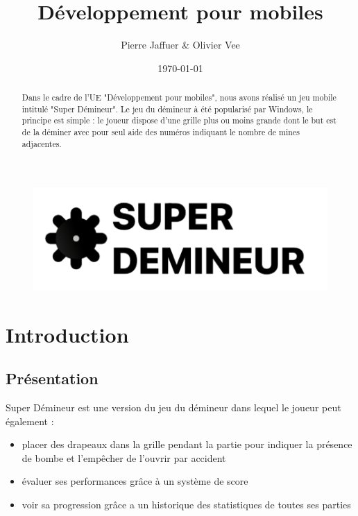 \documentclass{article}
\title{Développement pour mobiles}
\author{Pierre Jaffuer \& Olivier Vee}
\date{\today}
\begin{document}
\maketitle %
\begin{figure}[H]
    \centering
    \includegraphics[width=0.75\linewidth]{Ressources/AppsLogo.png}
\end{figure}

\begin{abstract}
Dans le cadre de l'UE "Développement pour mobiles", nous avons réalisé un jeu mobile intitulé "Super Démineur". 
Le jeu du démineur à été popularisé par Windows, le principe est simple : le joueur dispose d'une grille plus ou moins grande dont le but est de la déminer avec pour seul aide des numéros indiquant le nombre de mines adjacentes.
\end{abstract}

\newpage
\tableofcontents 
\newpage



\section{Introduction}
\subsection{Présentation}

Super Démineur est une version du jeu du démineur dans lequel le joueur peut également :
\begin{itemize}
    \item placer des drapeaux dans la grille pendant la partie pour indiquer la présence de bombe et l'empêcher de l'ouvrir par accident
    \item évaluer ses performances grâce à un système de score 
    \item voir sa progression grâce a un historique des statistiques de toutes ses parties
\end{itemize}
\end{document}
